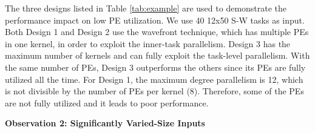 The three designs listed in Table \ref{tab:example} are used to demonstrate the performance impact on low PE utilization.
We use 40 12x50 S-W tasks as input.
Both Design 1 and Design 2 use the wavefront technique, which has multiple PEs in one kernel, 
in order to exploit the inner-task parallelism.
Design 3 has the maximum number of kernels and can fully exploit the task-level parallelism.
With the same number of PEs, Design 3 outperforms the others since its PEs are fully utilized all the time.
For Design 1, the maximum degree parallelism is 12, which is not divisible by the number of PEs per kernel (8).
Therefore, some of the PEs are not fully utilized and it leads to poor performance.



\vspace{1pt}
\textbf{Observation 2: Significantly Varied-Size Inputs}
\vspace{1pt}

